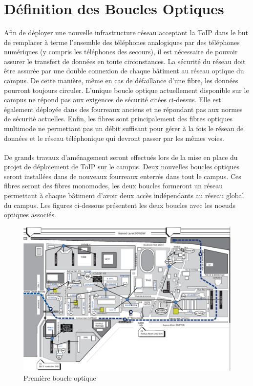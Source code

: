 \section{Définition des Boucles Optiques}

\paragraph{} Afin de déployer une nouvelle infrastructure réseau acceptant la ToIP dans le but de remplacer à terme l'ensemble des téléphones analogiques par des téléphones numériques (y compris les téléphones des secours), il est nécessaire de pouvoir assurer le transfert de données en toute circonstances. La sécurité du réseau doit être assurée par une double connexion de chaque bâtiment au réseau optique du campus. De cette manière, même en cas de défaillance d'une fibre, les données pourront toujours circuler. L'unique boucle optique actuellement disponible sur le campus ne répond pas aux exigences de sécurité citées ci-dessus. Elle est également déployée dans des fourreaux anciens et ne répondant pas aux normes de sécurité actuelles. Enfin, les fibres sont principalement des fibres optiques multimode ne permettant pas un débit suffisant pour gérer à la fois le réseau de données et le réseau téléphonique qui devront passer par les mêmes voies.

\paragraph{} De grands travaux d'aménagement seront effectués lors de la mise en place du projet de déploiement de ToIP sur le campus. Deux nouvelles boucles optiques seront installées dans de nouveaux fourreaux enterrés dans tout le campus. Ces fibres seront des fibres monomodes, les deux boucles formeront un réseau permettant à chaque bâtiment d'avoir deux accès indépendants au réseau global du campus. Les figures ci-dessous présentent les deux boucles avec les noeuds optiques associés.

\begin{figure}[h]
  \caption{\label{Plan_boucle1} Première boucle optique}
  \includegraphics[scale=0.6]{Boucle1.png}
\end{figure}

